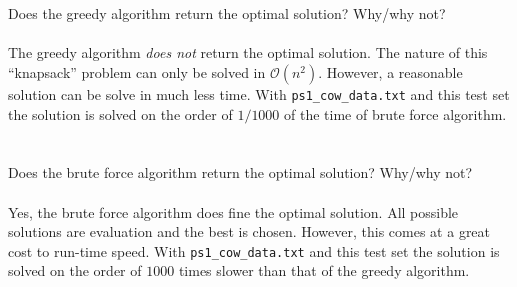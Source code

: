 \documentclass[letterpaper,11pt]{article}
\begin{document}
\section{}
Does the greedy algorithm return the optimal solution? Why/why not? \\
\\
The greedy algorithm \emph{does not} return the optimal solution.
The nature of this ``knapsack'' problem can only be solved in $\mathcal{O}(n^{2})$.
However, a reasonable solution can be solve in much less time.
With \texttt{ps1\_cow\_data.txt} and this test set the solution is solved on the order of $1/1000$ of the time of brute force
algorithm.

\section{}
Does the brute force algorithm return the optimal solution? Why/why not? \\
\\
Yes, the brute force algorithm does fine the optimal solution.
All possible solutions are evaluation and the best is chosen. 
However, this comes at a great cost to run-time speed.
With \texttt{ps1\_cow\_data.txt} and this test set the solution is solved on the order of $1000$ times slower
than that of the greedy algorithm. 
\end{document}
